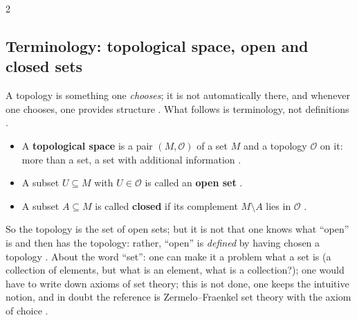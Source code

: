 \begin{paracol}{2}
\subsection{Terminology: topological space, open and closed sets}

A topology is something one \emph{chooses}; it is not automatically there, and whenever one chooses, one provides structure
. What follows is terminology, not definitions .

\begin{definition}\label{def:c01-open-closed}
\begin{itemize}
  \item A \textbf{topological space} is a pair $(M,\mathcal O)$ of a set $M$ and a topology $\mathcal O$ on it: more than a set, a set with
        additional information .
  \item A subset $U\subseteq M$ with $U\in\mathcal O$ is called an \textbf{open set} .
  \item A subset $A\subseteq M$ is called \textbf{closed} if its complement $M\setminus A$ lies in $\mathcal O$ .
\end{itemize}
\end{definition}
So the topology is the set of open sets; but it is not that one knows what ``open'' is and then has the topology: rather, ``open'' is
\emph{defined} by having chosen a topology . About the word ``set'': one can make it a problem
what a set is (a collection of elements, but what is an element, what is a collection?); one would have to write down axioms of
set theory; this is not done, one keeps the intuitive notion, and in doubt the reference is Zermelo--Fraenkel set theory with the
axiom of choice .


\end{paracol}
